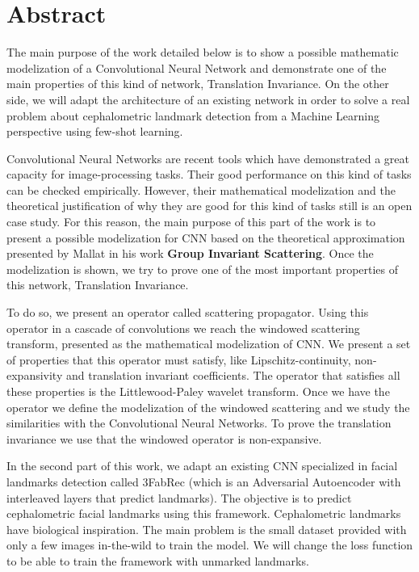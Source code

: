 %

\chapter{Abstract}

\noindent The main purpose of the work detailed below is to show a possible mathematic modelization of a Convolutional Neural Network and demonstrate one of the main properties of this kind of network, Translation Invariance.  On the other side, we will adapt the architecture of an existing network in order to solve a real problem about cephalometric landmark detection from a Machine Learning perspective using few-shot learning.

\medskip

\noindent Convolutional Neural Networks are recent tools which have demonstrated a great capacity for image-processing tasks. Their good performance on this kind of tasks can be checked empirically. However, their mathematical modelization and the theoretical justification of why they are good for this kind of tasks still is an open case study. For this reason, the main purpose of this part of the work is to present a possible modelization for CNN based on the theoretical approximation presented by Mallat in his work \textbf{Group Invariant Scattering}. Once the modelization is shown, we try to prove one of the most important properties of this network, Translation Invariance.

\medskip

\noindent To do so, we present an operator called scattering propagator. Using this operator in a cascade of convolutions we reach the windowed scattering transform, presented as the mathematical modelization of CNN. We present a set of properties that this operator must satisfy, like Lipschitz-continuity, non-expansivity and translation invariant coefficients. The operator that satisfies all these properties is the Littlewood-Paley wavelet transform. Once we have the operator we define the modelization of the windowed scattering and we study the similarities with the Convolutional Neural Networks. To prove the translation invariance we use that the windowed operator is non-expansive.

\medskip

\noindent In the second part of this work, we adapt an existing CNN specialized in facial landmarks detection called 3FabRec (which is an Adversarial Autoencoder with interleaved layers that predict landmarks). The objective is to predict cephalometric facial landmarks using this framework. Cephalometric landmarks have biological inspiration. The main problem is the small dataset provided with only a few images in-the-wild to train the model. We will change the loss function to be able to train the framework with unmarked landmarks.

